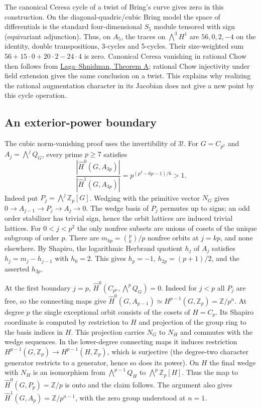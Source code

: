 \documentclass[11pt]{article}
\newcommand{\Z}{\mathbb Z}
\begin{document}
The canonical Ceresa cycle of a twist of Bring's curve gives zero
in this construction. On the diagonal-quadric/cubic Bring model the
space of differentials is the standard four-dimensional $S_5$ module
tensored with sign (equivariant adjunction). Thus, on $A_5$, the traces
on $\bigwedge^3 H^1$ are $56,0,2,-4$ on the identity, double
transpositions, 3-cycles and 5-cycles. Their size-weighted sum
$56+15\cdot0+20\cdot2-24\cdot4$ is zero. Canonical Ceresa vanishing
in rational Chow then follows from
\href{https://arxiv.org/abs/2406.03891}{Laga--Shnidman, Theorem A};
rational Chow injectivity under field extension gives the same
conclusion on a twist. This explains why realizing the rational
augmentation character in its Jacobian does not give a new point by
this cycle operation.

\subsection*{An exterior-power boundary}
The cubic norm-vanishing proof uses the invertibility of $3!$.
For $G=C_{p^2}$ and $A_j=\bigwedge^j Q_G$, every prime $p\ge7$ satisfies
\[
 \frac{|\widehat H^0(G,A_{3p})|}{|\widehat H^1(G,A_{3p})|}
 =p^{(p^2-6p-1)/6}>1 .
\]
Indeed put $P_j=\bigwedge^j\Z_p[G]$. Wedging with the primitive
vector $N_G$ gives $0\to A_{j-1}\to P_j\to A_j\to0$.
The wedge basis of $P_j$ permutes up to signs; an odd order stabilizer
has trivial sign, hence the orbit lattices are induced trivial lattices.
For $0<j<p^2$ the only nonfree subsets are unions of cosets of the
unique subgroup of order $p$. There are
$m_{kp}=\binom pk/p$ nonfree orbits at $j=kp$, and none elsewhere.
By Shapiro, the logarithmic Herbrand quotient $h_j$ of $A_j$ satisfies
$h_j=m_j-h_{j-1}$ with $h_0=2$. This gives $h_p=-1$,
$h_{2p}=(p+1)/2$, and the asserted $h_{3p}$.

At the first boundary $j=p$, $\widehat H^0(C_{p^n},\bigwedge^p Q_G)=0$.
Indeed for $j<p$ all $P_j$ are free, so the connecting maps give
$\widehat H^0(G,A_{p-1})\simeq H^{p-1}(G,\Z_p)=\Z/p^n$.
At degree $p$ the single exceptional orbit consists of the cosets of
$H=C_p$. Its Shapiro coordinate is computed by restriction to $H$
and projection of the group ring to the basis indices in $H$. This
projection carries $N_G$ to $N_H$ and commutes with the wedge
sequences. In the lower-degree connecting maps it induces restriction
$H^{p-1}(G,\Z_p)\to H^{p-1}(H,\Z_p)$, which is surjective (the
degree-two character generator restricts to a generator, hence so
does its power). On $H$ the final wedge with $N_H$ is an isomorphism
from $\bigwedge^{p-1}Q_H$ to $\bigwedge^p\Z_p[H]$. Thus the map to
$\widehat H^0(G,P_p)=\Z/p$ is onto and the claim follows. The argument
also gives $\widehat H^1(G,A_p)=\Z/p^{n-1}$, with the zero group
understood at $n=1$.
\end{document}
